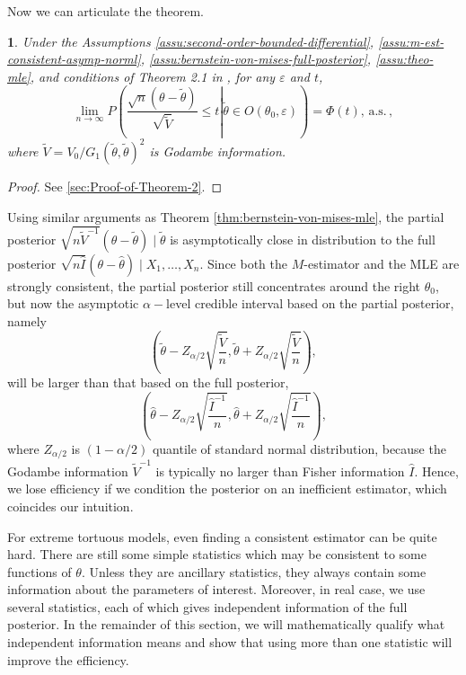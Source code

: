 \documentclass[oneside,english]{amsbook}
\numberwithin{section}{chapter}
\numberwithin{equation}{section}
\numberwithin{figure}{section}
\theoremstyle{plain}
\theoremstyle{plain}
\theoremstyle{definition}
\theoremstyle{plain}
\newtheorem{thm}{\protect\theoremname}
\theoremstyle{plain}
\theoremstyle{remark}
\theoremstyle{definition}
\theoremstyle{definition}
\newcommand{\ascv}{\,\mathrm{a.s.}\,}
\providecommand{\theoremname}{Theorem}
\begin{document}
Now we can articulate the theorem. 
\begin{thm}
\label{thm:partial-post-m-est}Under the Assumptions \ref{assu:second-order-bounded-differential},
\ref{assu:m-est-consistent-asymp-norml}, \ref{assu:bernstein-von-mises-full-posterior},
\ref{assu:theo-mle}, and conditions of Theorem 2.1 in \citet{rivoirard2012bernstein},
for any $\varepsilon$ and $t$, 
\[
\lim_{n\rightarrow\infty}P\left(\left.\frac{\sqrt{n}\left(\theta-\tilde{\theta}\right)}{\sqrt{\tilde{V}}}\le t\right|\tilde{\theta}\in O\left(\theta_{0},\varepsilon\right)\right)=\Phi\left(t\right),\ascv,
\]
where $\tilde{V}=V_{0}/G_{1}\left(\tilde{\theta},\tilde{\theta}\right)^{2}$
is Godambe information. \end{thm}
\begin{proof}
See  \ref{sec:Proof-of-Theorem-2}.
\end{proof}
Using similar arguments as Theorem \ref{thm:bernstein-von-mises-mle},
the partial posterior $\sqrt{n\tilde{V}^{-1}}\left(\theta-\tilde{\theta}\right)\mid\tilde{\theta}$ {{}
} {is asymptotically } close in distribution to  {the
}full posterior $\sqrt{n\hat{I}}\left(\theta-\hat{\theta}\right)\mid X_{1},\ldots,X_{n}$.
Since both the $M$-estimator and the MLE are strongly consistent,
the partial posterior still concentrates around the right $\theta_{0}$,
but now the asymptotic $\alpha-$level credible interval based on
the partial posterior, namely 
\[
\left(\tilde{\theta}-Z_{\alpha/2}\sqrt{\frac{\tilde{V}}{n}},\tilde{\theta}+Z_{\alpha/2}\sqrt{\frac{\tilde{V}}{n}}\right),
\]
will be larger than that based on the full posterior, 
\[
\left(\hat{\theta}-Z_{\alpha/2}\sqrt{\frac{\hat{I}^{-1}}{n}},\hat{\theta}+Z_{\alpha/2}\sqrt{\frac{\hat{I}^{-1}}{n}}\right),
\]
where $Z_{\alpha/2}$ is $\left(1-\alpha/2\right)$ quantile of standard
normal distribution, because the Godambe information $\tilde{V}^{-1}$
is typically no larger than Fisher information $\hat{I}$. Hence,
we lose efficiency if we condition the posterior on an inefficient
estimator, which coincides our intuition.

For extreme tortuous models, even finding a consistent estimator can
be quite hard. There are still some simple statistics which may be
consistent to some {{} } {functions } of
$\theta$. Unless they are ancillary statistics, they always contain
some information about the {{} } {parameters
} of interest. Moreover, in real case, we use several statistics,
each of which gives independent information of the full posterior.
In the remainder of this section, we will mathematically qualify what
independent information means and show that using more than one statistic
will improve the efficiency. 
\end{document}
